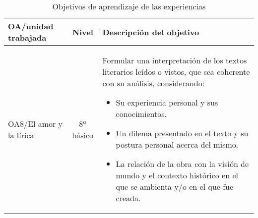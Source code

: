 \documentclass[spanish]{textolivre}
\begin{document}
\begin{small}
\begin{longtable}{p{2cm}cp{7cm}}
\caption{Objetivos de aprendizaje de las experiencias}
\label{annex-tab01}
\\
\toprule
OA/unidad trabajada & Nivel & Descripción del objetivo\\
\midrule
OA8/El amor y la lírica & 8º básico & Formular una interpretación de los textos literarios leídos o vistos, que sea coherente con su análisis, considerando:
\begin{itemize}
\item Su experiencia personal y sus conocimientos.
\item Un dilema presentado en el texto y su postura personal acerca del mismo.
\item La relación de la obra con la visión de mundo y el contexto histórico en el que se ambienta y/o en el que fue creada.
\end{itemize} \\


\end{longtable}
\end{small}
\end{document}
